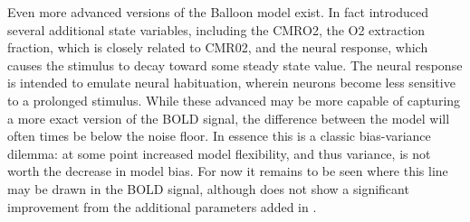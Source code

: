 \documentclass{article}
\begin{document}
Even more advanced versions of the Balloon model exist. In fact \cite{Buxton2004}
introduced several additional state variables, including the CMRO2, the O2 extraction
fraction, which is closely related to CMR02, and the neural response, which 
causes the stimulus to decay toward some steady state value. The 
neural response is intended to emulate neural habituation, wherein neurons
become less sensitive to a prolonged stimulus. While these advanced may be more
capable of capturing a more exact version of the BOLD signal, the difference
between the model will often times be below the noise floor. In essence this 
is a classic bias-variance
dilemma: at some point increased model flexibility, and thus variance, is not
worth the decrease in model bias. For now it remains to be seen where this
line may be drawn in the BOLD signal, although \cite{deneux2006} does not
show a significant improvement from the additional parameters added in 
\cite{Buxton2004}.
\end{document}
